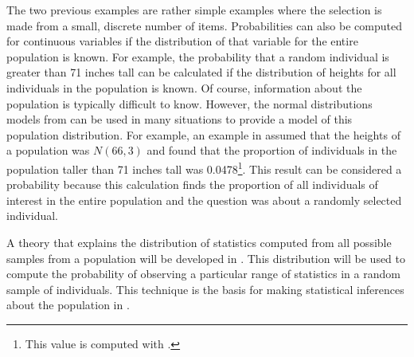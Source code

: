 \documentclass[10pt,openany]{book}\usepackage[]{graphicx}\usepackage[]{color}
\begin{document}

The two previous examples are rather simple examples where the selection is made from a small, discrete number of items.  Probabilities can also be computed for continuous variables if the distribution of that variable for the entire population is known.  For example, the probability that a random individual is greater than 71 inches tall can be calculated if the distribution of heights for all individuals in the population is known.  Of course, information about the population is typically difficult to know.  However, the normal distributions models from  can be used in many situations to provide a model of this population distribution.  For example, an example in  assumed that the heights of a population was $N(66,3)$ and found that the proportion of individuals in the population taller than 71 inches tall was 0.0478\footnote{This value is computed with .}.  This result can be considered a probability because this calculation finds the proportion of all individuals of interest in the entire population and the question was about a randomly selected individual.


A theory that explains the distribution of statistics computed from all possible samples from a population will be developed in .  This distribution will be used to compute the probability of observing a particular range of statistics in a random sample of individuals.  This technique is the basis for making statistical inferences about the population in .
\end{document}
